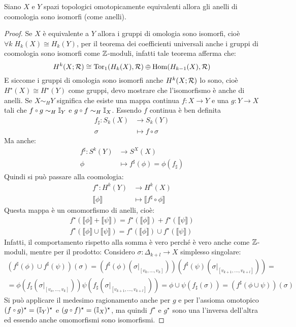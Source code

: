 \begin{lemma}
  Siano $ X $ e $ Y $ spazi topologici omotopicamente equivalenti allora gli
  anelli di coomologia sono isomorfi (come anelli).
\end{lemma}
\begin{proof}
  Se $ X $ è equivalente a $ Y $ allora i gruppi di omologia sono isomorfi, cioè
  $ \forall k \; H_k(X) \cong H_k(Y) $, per il teorema dei coefficienti universali anche i
  gruppi di coomologia sono isomorfi come $ \mathbb{Z} $-moduli, infatti tale teorema
  afferma che:
  \[
    H^k(X; \mathcal{R}) \cong \mathrm{Tor_1}( H_k(X), \mathcal{R}) \oplus \mathrm{Hom}( H_{k-1}(X), \mathcal{R})
  \]
  E siccome i gruppi di omologia sono isomorfi anche $ H^k(X; \mathcal{R}) $ lo sono,
  cioè $ H^\star(X) \cong H^\star(Y) $ come gruppi, devo mostrare che l'isomorfismo è anche
  di anelli. Se $ X \sim_H Y $ significa che esiste una mappa continua
  $ f \colon X \to Y $ e una $ g \colon Y \to X $ tali che
  $ f \circ g \sim_H \Id{Y} $ e $ g \circ f \sim_H \Id{X} $. Essendo $ f $ continua è ben
  definita
  \begin{align*}
    f_\sharp \colon S_k(X) & \to S_k(Y) \\
    \sigma & \mapsto f \circ \sigma
  \end{align*}
  Ma anche:
  \begin{align*}
    f^\sharp \colon S^k(Y) & \to S^X(X) \\
    \phi & \mapsto f^\sharp(\phi) = \phi(f_\sharp)
  \end{align*}
  Quindi si può passare alla coomologia:
  \begin{align*}
    f^\star \colon H^k(Y) & \to H^k(X) \\
    \llbracket \phi \rrbracket & \mapsto \llbracket f^\sharp \circ \phi \rrbracket
  \end{align*}
  Questa mappa è un omomorfismo di anelli, cioè:
  \begin{gather*}
    f^\star(\llbracket\phi\rrbracket + \llbracket\psi\rrbracket) = f^\star(\llbracket\phi\rrbracket) + f^\star(\llbracket\psi\rrbracket) \\
    f^\star(\llbracket\phi\rrbracket \cup \llbracket\psi\rrbracket) = f^\star(\llbracket\phi\rrbracket) \cup f^\star(\llbracket\psi\rrbracket)
  \end{gather*}
  Infatti, il comportamento rispetto alla somma è vero perché è vero anche come $ \mathbb{Z} $-moduli,
  mentre per il prodotto:
  Considero $ \sigma \colon \Delta_{k+l} \to X $ simplesso singolare:
  \begin{gather*}
    (f^\sharp(\phi) \cup f^\sharp(\psi))(\sigma) = (f^\sharp(\phi)(\sigma\lvert_{[v_0, \dots, v_k]})) (f^\sharp(\psi)(\sigma\lvert_{[v_{k+1}, \dots, v_{k+l}]})) = \\
    = \phi(f_\sharp(\sigma\lvert_{[v_o, \dots, v_k]}))\psi(f_\sharp(\sigma\lvert_{[v_{k+1}, \dots, v_{k+l}]})) = \phi \cup \psi (f_\sharp (\sigma)) = (f^\sharp(\phi \cup \psi))(\sigma)
  \end{gather*}
  Si può applicare il medesimo ragionamento anche per $ g $ e per l'assioma omotopico
  $ (f \circ g)^\star = (\Id{Y})^\star $ e $ (g \circ f)^\star = (\Id{X})^\star $, ma quindi $ f^\star $ e $ g^\star $ sono
  una l'inversa dell'altra ed essendo anche omomorfismi sono isomorfismi.
\end{proof}

